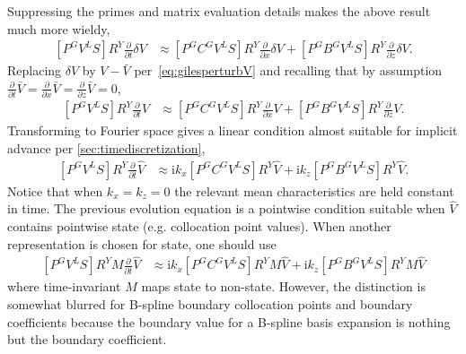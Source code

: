 \documentclass[letterpaper,11pt,nointlimits,reqno,draft]{amsbook}
\newcommand{\ii}{\ensuremath{\mathrm{i}}}
\begin{document}
Suppressing the primes and matrix evaluation details makes the above result
much more wieldy,
\begin{align}
\label{eq:dimeulertransformcharnotYphys}
  \left[P^G V^L S\right]
  R^Y
  \frac{\partial}{\partial{}t}
  \delta{}V
&\approx
  \left[P^G C^G V^L S\right]
  R^Y
  \frac{\partial}{\partial{}x}
  \delta{}V
  +
  \left[P^G B^G V^L S\right]
  R^Y
  \frac{\partial}{\partial{}z}
  \delta{}V
.
\end{align}
Replacing $\delta{}V$ by $V - \bar{V}$ per~\eqref{eq:gilesperturbV} and
recalling that by assumption
$
    \frac{\partial}{\partial{}t} \bar{V}
  = \frac{\partial}{\partial{}x} \bar{V}
  = \frac{\partial}{\partial{}z} \bar{V}
  = 0
$,
\begin{align}
  \left[P^G V^L S\right]
  R^Y
  \frac{\partial}{\partial{}t}
  V
&\approx
  \left[P^G C^G V^L S\right]
  R^Y
  \frac{\partial}{\partial{}x}
  V
  +
  \left[P^G B^G V^L S\right]
  R^Y
  \frac{\partial}{\partial{}z}
  V
.
\end{align}
Transforming to Fourier space gives a linear condition almost suitable for
implicit advance per \autoref{sec:timediscretization},
\begin{align}
  \left[P^G V^L S\right]
  R^Y
  \frac{\partial}{\partial{}t}
  \hat{V}
&\approx
  \ii k_x
  \left[P^G C^G V^L S\right]
  R^Y
  \hat{V}
  +
  \ii k_z
  \left[P^G B^G V^L S\right]
  R^Y
  \hat{V}
.
\end{align}
Notice that when $k_x=k_z=0$ the relevant mean characteristics are held
constant in time.  The previous evolution equation is a pointwise condition
suitable when $\hat{V}$ contains pointwise state (e.g. collocation point
values).  When another representation is chosen for state, one should use
\begin{align}
\label{eq:dimeulertransformcharnotYwave}
  \left[P^G V^L S\right]
  R^Y
  M \frac{\partial}{\partial{}t}
  \hat{V}
&\approx
  \ii k_x
  \left[P^G C^G V^L S\right]
  R^Y
  M \hat{V}
  +
  \ii k_z
  \left[P^G B^G V^L S\right]
  R^Y
  M \hat{V}
\end{align}
where time-invariant $M$ maps state to non-state.  However, the distinction is
somewhat blurred for B-spline boundary collocation points and boundary
coefficients because the boundary value for a B-spline basis expansion is
nothing but the boundary coefficient.
\end{document}
